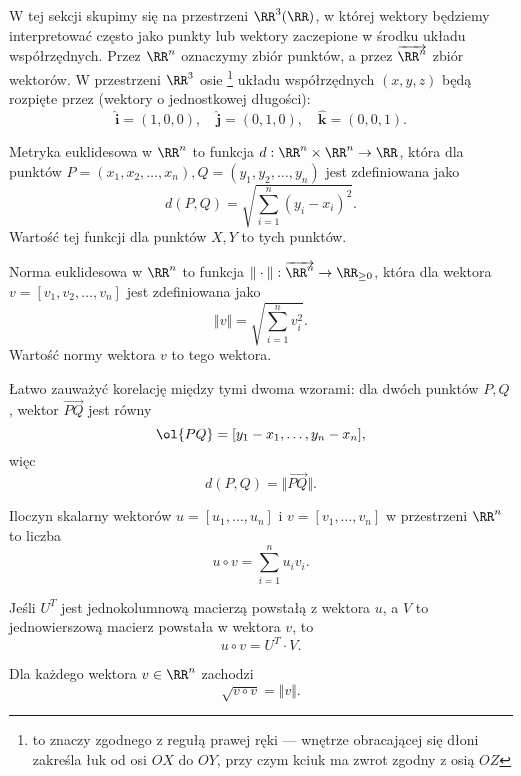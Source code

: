 W tej sekcji skupimy się na przestrzeni $\RR^3(\RR)$, w której wektory będziemy interpretować często jako punkty lub wektory zaczepione w środku układu współrzędnych. Przez $\RR^n$ oznaczymy zbiór punktów, a przez $\overrightarrow{\RR^n}$ zbiór wektorów. W przestrzeni $\RR^3$ osie \footnote{to znaczy zgodnego z regułą prawej ręki --- wnętrze obracającej się dłoni zakreśla łuk od osi $OX$ do $OY$, przy czym kciuk ma zwrot zgodny z osią $OZ$} układu współrzędnych $(x, y, z)$ będą rozpięte przez  (wektory o jednostkowej długości):
\[ \mathbf{\hat{i}} = (1, 0, 0), \quad \mathbf{\hat{j}} = (0, 1, 0), \quad \mathbf{\hat{k}} = (0, 0, 1). \]

\begin{definition}
    \label{d:Euclidean metric}
    Metryka euklidesowa w $\RR^n$ to funkcja $d : \RR^n \times \RR^n \to \RR$, która dla punktów $P = (x_1, x_2, \ldots, x_n), Q = (y_1, y_2, \ldots, y_n)$ jest zdefiniowana jako
    \[ d(P, Q) = \sqrt{\sum_{i = 1}^n (y_i - x_i)^2}. \]
    Wartość tej funkcji dla punktów $X, Y$ to  tych punktów.
\end{definition}

\begin{definition}
    Norma euklidesowa w $\RR^n$ to funkcja $\Vert\cdot\Vert : \overrightarrow{\RR^n} \to \RR_{\geq 0}$, która dla wektora $v = [v_1, v_2, \ldots, v_n]$ jest zdefiniowana jako
    \[ \Vert v\Vert = \sqrt{\sum_{i=1}^n v_i^2}. \]
    Wartość normy wektora $v$ to  tego wektora.
\end{definition}

Łatwo zauważyć korelację między tymi dwoma wzorami: dla dwóch punktów $P, Q$, wektor $\overrightarrow{PQ}$ jest równy
\[ \ol{PQ} = [y_1 - x_1, \ldots, y_n - x_n], \]
więc
\[ d(P, Q) = \Vert\overrightarrow{PQ}\Vert. \]

\begin{definition}
    Iloczyn skalarny wektorów $u = [u_1, \ldots, u_n]$ i $v = [v_1, \ldots, v_n]$ w przestrzeni $\RR^n$ to liczba
    \[ u \circ v = \sum_{i=1}^n u_iv_i. \]
\end{definition}

\begin{fact}
    Jeśli $U^T$ jest jednokolumnową macierzą powstałą z wektora $u$, a $V$ to jednowierszową macierz powstała w wektora $v$, to
    \[ u \circ v = U^T \cdot V. \]
\end{fact}

\begin{fact}
    Dla każdego wektora $v \in \RR^n$ zachodzi
    \[ \sqrt{v \circ v} = \Vert v \Vert. \]
\end{fact}

